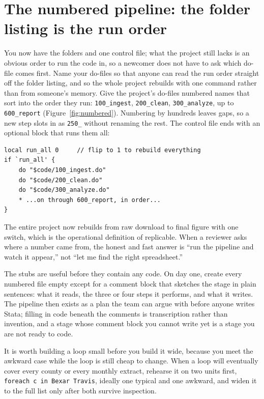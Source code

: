 \section{The numbered pipeline: the folder listing is the run order}\label{sec:numbered}
You now have the folders and one control file; what the project still lacks is an obvious order to run the code in, so a newcomer does not have to ask which do-file comes first. Name your do-files so that anyone can read the run order straight off the folder listing, and so the whole project rebuilds with one command rather than from someone's memory. Give the project's do-files numbered names that sort into the order they run: \texttt{100\_ingest}, \texttt{200\_clean}, \texttt{300\_analyze}, up to \texttt{600\_report} (Figure~\ref{fig:numbered}). Numbering by hundreds leaves gaps, so a new step slots in as \texttt{250\_} without renaming the rest. The control file ends with an optional block that runs them all:
\par
{\footnotesize
\begin{verbatim}
local run_all 0     // flip to 1 to rebuild everything
if `run_all' {
    do "$code/100_ingest.do"
    do "$code/200_clean.do"
    do "$code/300_analyze.do"
    * ...on through 600_report, in order...
}
\end{verbatim}
}
The entire project now rebuilds from raw download to final figure with one switch, which is the operational definition of replicable. When a reviewer asks where a number came from, the honest and fast answer is \enquote{run the pipeline and watch it appear,} not \enquote{let me find the right spreadsheet.}

The stubs are useful before they contain any code. On day one, create every numbered file empty except for a comment block that sketches the stage in plain sentences: what it reads, the three or four steps it performs, and what it writes. The pipeline then exists as a plan the team can argue with before anyone writes Stata; filling in code beneath the comments is transcription rather than invention, and a stage whose comment block you cannot write yet is a stage you are not ready to code.

It is worth building a loop small before you build it wide, because you meet the awkward case while the loop is still cheap to change. When a loop will eventually cover every county or every monthly extract, rehearse it on two units first, \texttt{foreach c in Bexar Travis}, ideally one typical and one awkward, and widen it to the full list only after both survive inspection.

